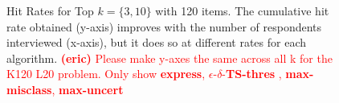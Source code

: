 \documentclass[nonblindrev]{informs3}
\newcommand{\eric}[1]{\textcolor{red}{\textbf{(eric)} #1}}
\newcommand{\fixedexpress}{\textbf{express}}
\newcommand{\mismin}{\textbf{max-misclass}}
\newcommand{\edtsthres}{$\epsilon$-$\delta$-\textbf{TS-thres} }
\newcommand{\uncert}{\textbf{max-uncert} }
\begin{document}
\begin{figure}%
    \caption{Hit Rates for Top $k=\{3,10\}$ with 120 items. The cumulative hit rate obtained (y-axis) improves with the number of respondents interviewed (x-axis), but it does so at different rates for each algorithm. \eric{Please make y-axes the same across all k for the K120 L20 problem. Only show \fixedexpress, \edtsthres, \mismin, \uncert }}%
    \label{fig:K120_L20_k3hit_k10hit}%
 	\begin{center}
    \qquad
	\end{center}
\end{figure}
\end{document}
